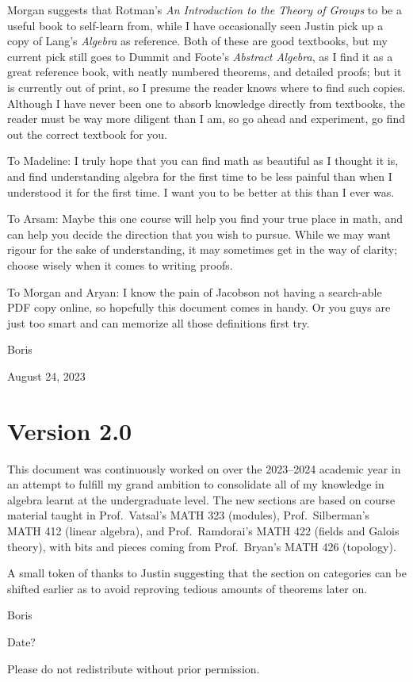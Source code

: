 Morgan suggests that Rotman's \textit{An Introduction to the Theory of Groups}
to be a useful book to self-learn from,
while I have occasionally seen Justin
pick up a copy of Lang's \textit{Algebra} as reference.
Both of these are good textbooks,
but my current pick still goes to Dummit and Foote's \textit{Abstract Algebra},
as I find it as a great reference book,
with neatly numbered theorems, and detailed proofs;
but it is currently out of print,
so I presume the reader knows where to find such copies.
Although I have never been one to absorb knowledge directly from textbooks,
the reader must be way more diligent than I am,
so go ahead and experiment,
go find out the correct textbook for you.

\medskip

To Madeline:
I truly hope that you can find math as beautiful as I thought it is,
and find understanding algebra for the first time
to be less painful than when I understood it for the first time.
I want you to be better at this than I ever was.

To Arsam:
Maybe this one course will help you find your true place in math,
and can help you decide the direction that you wish to pursue.
While we may want rigour for the sake of understanding,
it may sometimes get in the way of clarity;
choose wisely when it comes to writing proofs.

To Morgan and Aryan:
I know the pain of
Jacobson not having a search-able PDF copy online,
so hopefully this document comes in handy.
Or you guys are just too smart
and can memorize all those definitions first try.

\medskip

Boris

August 24, 2023

\section*{Version 2.0}

This document was continuously worked on
over the 2023--2024 academic year
in an attempt to fulfill my grand ambition
to consolidate all of my knowledge in algebra
learnt at the undergraduate level.
The new sections are based on course material taught in
Prof.\ Vatsal's MATH 323 (modules),
Prof.\ Silberman's MATH 412 (linear algebra),
and Prof.\ Ramdorai's MATH 422 (fields and Galois theory),
with bits and pieces coming from Prof.\ Bryan's MATH 426 (topology).

A small token of thanks to Justin
suggesting that the section on categories can be shifted earlier
as to avoid reproving tedious amounts of theorems later on.

\medskip

Boris

Date?

\vspace{5mm}

Please do not redistribute without prior permission.
